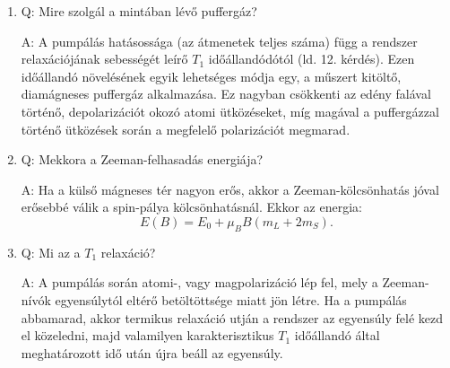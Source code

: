\begin{enumerate}
    \item Q: Mire szolgál a mintában lévő puffergáz?
    \begin{displayquote}
    	A: A pumpálás hatásossága (az átmenetek teljes száma) függ a rendszer relaxációjának sebességét leírő $T_{1}$ időállandódótól (ld. 12. kérdés). Ezen időállandó növelésének egyik lehetséges módja egy, a műszert kitöltő, diamágneses puffergáz alkalmazása. Ez nagyban csökkenti az edény falával történő, depolarizációt okozó atomi ütközéseket, míg magával a puffergázzal történő ütközések során a megfelelő polarizációt megmarad.
    \end{displayquote}
    
    \item Q: Mekkora a Zeeman-felhasadás energiája?
    \begin{displayquote}
    	A: Ha a külső mágneses tér nagyon erős, akkor a Zeeman-kölcsönhatás jóval erősebbé válik a spin-pálya kölcsönhatásnál. Ekkor az energia:
    		\begin{equation}
    		E \left( B \right)
    		=
    		E_{0} + \mu_{B} B \left(m_{L} + 2m_{S} \right).
    		\end{equation}
    \end{displayquote}
    
    \item Q: Mi az a $T_{1}$ relaxáció?
    \begin{displayquote}
    	A: A pumpálás során atomi-, vagy magpolarizáció lép fel, mely a Zeeman-nívók egyensúlytól eltérő betöltöttsége miatt jön létre. Ha a pumpálás abbamarad, akkor termikus relaxáció utján a rendszer az egyensúly felé kezd el közeledni, majd valamilyen karakterisztikus $T_{1}$ időállandó által meghatározott idő után újra beáll az egyensúly.
    \end{displayquote}
\end{enumerate}